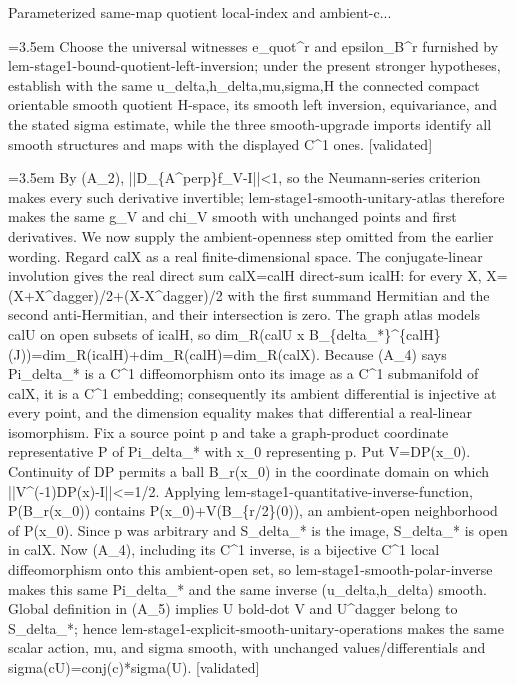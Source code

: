 \documentclass{article}
\newcommand{\step}[1]{\par\noindent\hangindent=3.5em\hangafter=1%
  \makebox[3.5em][l]{\textbf{#1.}}}
\newcommand{\steptag}[1]{\hfill{\small\textsf{[#1]}}}
\begin{document}
\begin{proofbox}{Parameterized same-map quotient local-index and ambient-c...}
\step{1.1} Choose the universal witnesses e\_quot\textasciicircum{}r and epsilon\_B\textasciicircum{}r furnished by lem-stage1-bound-quotient-left-inversion; under the present stronger hypotheses, establish with the same u\_delta,h\_delta,mu,sigma,H the connected compact orientable smooth quotient H-space, its smooth left inversion, equivariance, and the stated sigma estimate, while the three smooth-upgrade imports identify all smooth structures and maps with the displayed C\textasciicircum{}1 ones. \steptag{validated} \\[6pt]
\step{1.1.1} By (A\_2), ||D\_\{A\textasciicircum{}perp\}f\_V-I||<1, so the Neumann-series criterion makes every such derivative invertible; lem-stage1-smooth-unitary-atlas therefore makes the same g\_V and chi\_V smooth with unchanged points and first derivatives. We now supply the ambient-openness step omitted from the earlier wording. Regard calX as a real finite-dimensional space. The conjugate-linear involution gives the real direct sum calX=calH direct-sum icalH: for every X, X=(X+X\textasciicircum{}dagger)/2+(X-X\textasciicircum{}dagger)/2 with the first summand Hermitian and the second anti-Hermitian, and their intersection is zero. The graph atlas models calU on open subsets of icalH, so dim\_R(calU x B\_\{delta\_*\}\textasciicircum{}\{calH\}(J))=dim\_R(icalH)+dim\_R(calH)=dim\_R(calX). Because (A\_4) says Pi\_delta\_* is a C\textasciicircum{}1 diffeomorphism onto its image as a C\textasciicircum{}1 submanifold of calX, it is a C\textasciicircum{}1 embedding; consequently its ambient differential is injective at every point, and the dimension equality makes that differential a real-linear isomorphism. Fix a source point p and take a graph-product coordinate representative P of Pi\_delta\_* with x\_0 representing p. Put V=DP(x\_0). Continuity of DP permits a ball B\_r(x\_0) in the coordinate domain on which ||V\textasciicircum{}(-1)DP(x)-I||<=1/2. Applying lem-stage1-quantitative-inverse-function, P(B\_r(x\_0)) contains P(x\_0)+V(B\_\{r/2\}(0)), an ambient-open neighborhood of P(x\_0). Since p was arbitrary and S\_delta\_* is the image, S\_delta\_* is open in calX. Now (A\_4), including its C\textasciicircum{}1 inverse, is a bijective C\textasciicircum{}1 local diffeomorphism onto this ambient-open set, so lem-stage1-smooth-polar-inverse makes this same Pi\_delta\_* and the same inverse (u\_delta,h\_delta) smooth. Global definition in (A\_5) implies U bold-dot V and U\textasciicircum{}dagger belong to S\_delta\_*; hence lem-stage1-explicit-smooth-unitary-operations makes the same scalar action, mu, and sigma smooth, with unchanged values/differentials and sigma(cU)=conj(c)*sigma(U). \steptag{validated} \\[4pt]

\end{proofbox}
\end{document}
